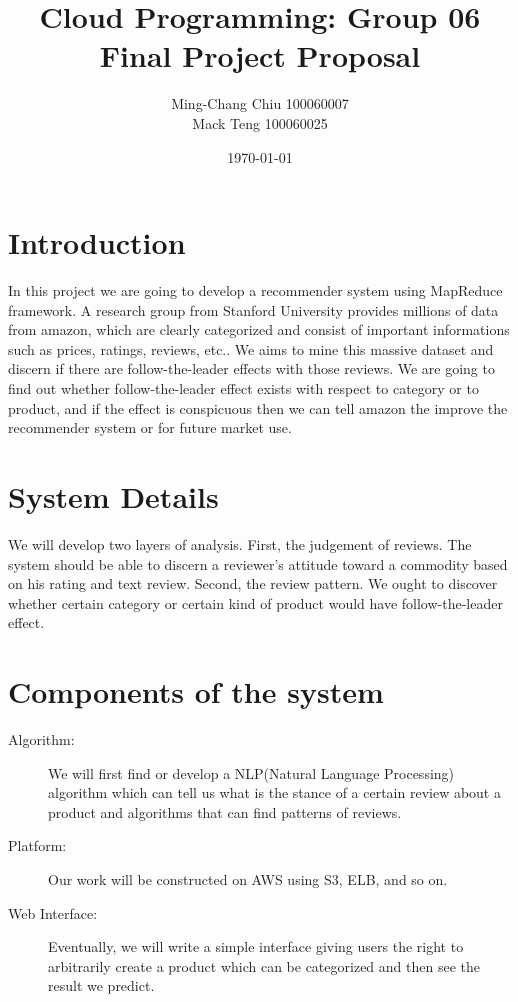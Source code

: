 \documentclass[12pt,a4paper]{article}
\title{Cloud Programming: Group 06 Final Project Proposal}
\author{Ming-Chang Chiu 100060007\\Mack Teng 100060025}
\date{\today}
\begin{document}
\maketitle
\fontsize{12}{20pt}\selectfont %

\section{Introduction}

In this project we are going to develop a recommender system using MapReduce framework. A research group from Stanford University provides millions of data from amazon, which are clearly categorized and consist of important informations such as prices, ratings, reviews, etc.. We aims to mine this massive dataset and discern if there are follow-the-leader effects with those reviews. We are going to find out whether follow-the-leader effect exists with respect to category or to product, and if the effect is conspicuous then we can tell amazon the improve the recommender system or for future market use.

\section{System Details}

We will develop two layers of analysis. 
First, the judgement of reviews. The system should be able to discern a reviewer's attitude toward a commodity based on his rating and text review.
Second, the review pattern. We ought to discover whether certain category or certain kind of product would have follow-the-leader effect.

\section{Components of the system}

\begin{description}
\item [Algorithm:]  We will first find or develop a NLP(Natural Language Processing) algorithm which can tell us what is the stance of a certain review about a product and algorithms that can find patterns of reviews.
\item [Platform:] Our work will be constructed on AWS using S3, ELB, and so on.
\item [Web Interface:] Eventually, we will write a simple interface giving users the right to arbitrarily create a product which can be categorized and then see the result we predict.
\end{description}
\end{document}
